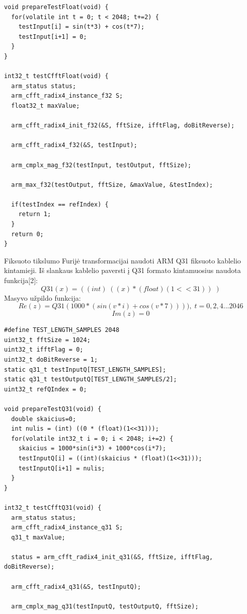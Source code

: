 \documentclass[a4paper, 12pt]{article} %
\begin{document}
\begin{onehalfspacing}
\begin{verbatim}
void prepareTestFloat(void) {
  for(volatile int t = 0; t < 2048; t+=2) {
    testInput[i] = sin(t*3) + cos(t*7);
    testInput[i+1] = 0;
  }
}

int32_t testCfftFloat(void) { 
  arm_status status; 
  arm_cfft_radix4_instance_f32 S; 
  float32_t maxValue;  
   
  arm_cfft_radix4_init_f32(&S, fftSize, ifftFlag, doBitReverse); 
   
  arm_cfft_radix4_f32(&S, testInput); 
   
  arm_cmplx_mag_f32(testInput, testOutput, fftSize);  
   
  arm_max_f32(testOutput, fftSize, &maxValue, &testIndex); 
   
  if(testIndex == refIndex) { 
    return 1;
  }
  return 0;
} 
\end{verbatim}  
Fiksuoto tikslumo Furij\.e transformacijai naudoti ARM Q31 fiksuoto kablelio kintamieji. I\v{s} slankaus kablelio paversti \k{i} Q31 formato kintamuosius naudota funkcija$[$2$]$:
\begin{equation}
Q31(x)= ((int)\; ((x)*(float)(1<<31))\; )
\end{equation}   
Masyvo u\v{z}pildo funkcija:
\begin{equation*}
Re(z) = Q31(1000*(sin(v*i) + cos(v*7)))),\; t = 0, 2, 4... 2046
\end{equation*}
\begin{equation}
Im(z) = 0
\end{equation}
\begin{verbatim}
#define TEST_LENGTH_SAMPLES 2048
uint32_t fftSize = 1024; 
uint32_t ifftFlag = 0; 
uint32_t doBitReverse = 1; 
static q31_t testInputQ[TEST_LENGTH_SAMPLES]; 
static q31_t testOutputQ[TEST_LENGTH_SAMPLES/2]; 
uint32_t refQIndex = 0;

void prepareTestQ31(void) {
  double skaicius=0;
  int nulis = (int) ((0 * (float)(1<<31)));
  for(volatile int32_t i = 0; i < 2048; i+=2) {
    skaicius = 1000*sin(i*3) + 1000*cos(i*7);
    testInputQ[i] = ((int)(skaicius * (float)(1<<31)));
    testInputQ[i+1] = nulis;
  }
}

int32_t testCfftQ31(void) { 
  arm_status status; 
  arm_cfft_radix4_instance_q31 S; 
  q31_t maxValue; 
   
  status = arm_cfft_radix4_init_q31(&S, fftSize, ifftFlag, doBitReverse); 
   
  arm_cfft_radix4_q31(&S, testInputQ); 
  
  arm_cmplx_mag_q31(testInputQ, testOutputQ, fftSize);  
 

\end{verbatim}
\end{onehalfspacing}
\end{document}
